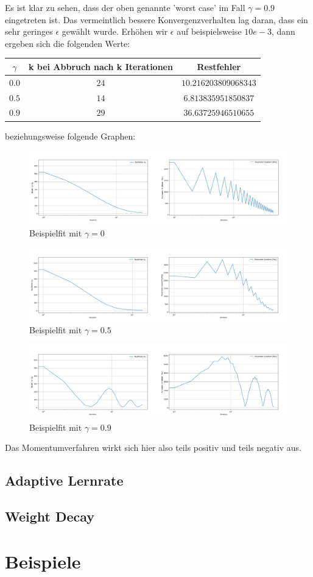 \documentclass{article}
\theoremstyle{plain} %
\theoremstyle{definition} %
\begin{document}
Es ist klar zu sehen, dass der oben genannte 'worst case' im Fall $\gamma=0.9$ eingetreten ist. Das vermeintlich bessere Konvergenzverhalten lag daran, dass ein sehr geringes $\epsilon$ gewählt wurde. Erhöhen wir $\epsilon$ auf beispielsweise $10e-3$, dann ergeben sich die folgenden Werte:

\begin{tabular}{ccc}
  \toprule
  $\gamma$ & k bei Abbruch nach k Iterationen & Restfehler\\
  \midrule
  $0.0$ & $24$ & $10.216203809068343$\\
  $0.5$ & $14$ & $6.813835951850837$\\
  $0.9$ & $29$ & $36.63725946510655$\\
\end{tabular}

beziehungsweise folgende Graphen:

\begin{figure}[H]
  \centering
  \includegraphics[width=\textwidth]{Momentum_0_0_Error_10e-3}
  \caption{Beispielfit mit $\gamma=0$}
\end{figure}
\begin{figure}[H]
  \centering
  \includegraphics[width=\textwidth]{Momentum_0_5_Error_10e-3}
  \caption{Beispielfit mit $\gamma=0.5$}
\end{figure}
\begin{figure}[H]
  \centering
  \includegraphics[width=\textwidth]{Momentum_0_9_Error_10e-3}
  \caption{Beispielfit mit $\gamma=0.9$}
\end{figure}

Das Momentumverfahren wirkt sich hier also teils positiv und teils negativ aus.

\subsection{Adaptive Lernrate}
\subsection{Weight Decay}

\section{Beispiele}



\end{document}
